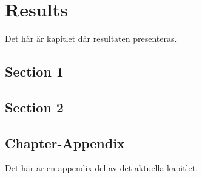 \chapter{Results}\label{cha:Research}
%
Det här är kapitlet där resultaten presenteras.

\section{Section 1}\label{sec:research:history}

\section{Section 2}

\begin{chapter-appendix}

\section{Chapter-Appendix}
%
Det här är en appendix-del av det aktuella kapitlet.

\end{chapter-appendix}
